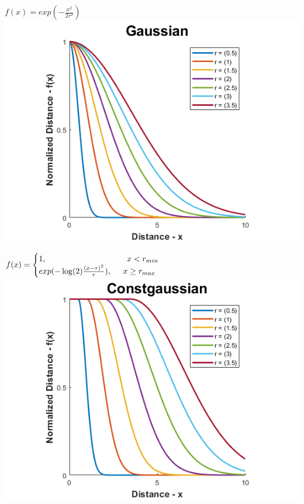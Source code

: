 \documentclass[12pt, a4paper, titlepage, openany]{book}
\begin{document}
\begin{description}[labelsep=1cm, labelwidth=2cm, nosep,style=multiline,leftmargin=3cm]
\begin{description}[labelsep=14em, labelwidth=10em, nosep,style=multiline,leftmargin=6cm]
	\item[\texttt{"gaussian"}] $f\left( x \right) = exp(-\frac{x^2}{2r^{2}})$ \\ 
		\includegraphics[scale=.5]{FuzzGaussv1.png} \\

	\item[\texttt{"constgaussian"}] $f(x) = \begin{cases} 1,  \hspace{35mm}  x<r_{min} 
	\\  exp(-\log(2)\frac{(x-r)^2}{r}),  \hspace{5mm}  x\ge r_{max} \end{cases}$\\
		\includegraphics[scale=.5]{FuzzCGv1.png} \\


\end{description}
\end{description}
\end{document}
